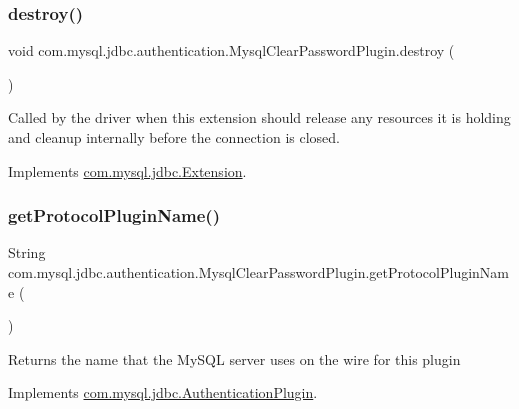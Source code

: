 \subsubsection{\texorpdfstring{destroy()}{destroy()}}
{\footnotesize\ttfamily void com.\+mysql.\+jdbc.\+authentication.\+Mysql\+Clear\+Password\+Plugin.\+destroy (\begin{DoxyParamCaption}{ }\end{DoxyParamCaption})}

Called by the driver when this extension should release any resources it is holding and cleanup internally before the connection is closed. 

Implements \mbox{\hyperlink{interfacecom_1_1mysql_1_1jdbc_1_1_extension_a7d9644de305efed5df71f3fcc7cc1772}{com.\+mysql.\+jdbc.\+Extension}}.

\mbox{\label{classcom_1_1mysql_1_1jdbc_1_1authentication_1_1_mysql_clear_password_plugin_af847af9fb6871a67066bdce231fb024e}} 
\subsubsection{\texorpdfstring{get\+Protocol\+Plugin\+Name()}{getProtocolPluginName()}}
{\footnotesize\ttfamily String com.\+mysql.\+jdbc.\+authentication.\+Mysql\+Clear\+Password\+Plugin.\+get\+Protocol\+Plugin\+Name (\begin{DoxyParamCaption}{ }\end{DoxyParamCaption})}

Returns the name that the My\+S\+QL server uses on the wire for this plugin 

Implements \mbox{\hyperlink{interfacecom_1_1mysql_1_1jdbc_1_1_authentication_plugin_a90dfb5c717939a248527c5bdf512b510}{com.\+mysql.\+jdbc.\+Authentication\+Plugin}}.

\mbox{\label{classcom_1_1mysql_1_1jdbc_1_1authentication_1_1_mysql_clear_password_plugin_a95aa0f048c17c5acf28095eed0bd726a}} 
